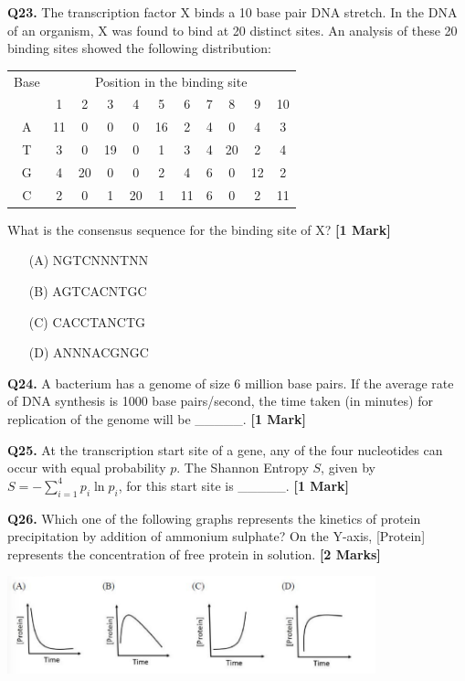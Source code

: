 \documentclass[11pt]{article}
\newcommand{\questiona}[2]{
    \noindent\textbf{Q#2.} #1 \hfill \textbf{[1 Mark]}
}
\newcommand{\questionb}[2]{
    \noindent\textbf{Q#2.} #1 \hfill \textbf{[2 Marks]}
}
\begin{document}
\vspace{0.5cm}

\questiona{The transcription factor X binds a 10 base pair DNA stretch. In the DNA of an organism, X was found to bind at 20 distinct sites. An analysis of these 20 binding sites showed the following distribution:

\begin{center}
\begin{tabular}{|c|c|c|c|c|c|c|c|c|c|c|}
\hline
Base & \multicolumn{10}{c|}{Position in the binding site} \\
\cline{2-11}
 & 1 & 2 & 3 & 4 & 5 & 6 & 7 & 8 & 9 & 10 \\
\hline
A & 11 & 0 & 0 & 0 & 16 & 2 & 4 & 0 & 4 & 3 \\
T & 3 & 0 & 19 & 0 & 1 & 3 & 4 & 20 & 2 & 4 \\
G & 4 & 20 & 0 & 0 & 2 & 4 & 6 & 0 & 12 & 2 \\
C & 2 & 0 & 1 & 20 & 1 & 11 & 6 & 0 & 2 & 11 \\
\hline
\end{tabular}
\end{center}

What is the consensus sequence for the binding site of X?}{23}
\begin{enumerate}
    \item[(A)] NGTCNNNTNN
    \item[(B)] AGTCACNTGC  
    \item[(C)] CACCTANCTG
    \item[(D)] ANNNACGNGC
\end{enumerate}

\vspace{0.5cm}

\questiona{A bacterium has a genome of size 6 million base pairs. If the average rate of DNA synthesis is 1000 base pairs/second, the time taken (in minutes) for replication of the genome will be \_\_\_\_\_.}{24}

\vspace{0.5cm}

\questiona{At the transcription start site of a gene, any of the four nucleotides can occur with equal probability $p$. The Shannon Entropy $S$, given by $S = -\sum_{i=1}^{4} p_i \ln p_i$, for this start site is \_\_\_\_\_.}{25}

\vspace{0.5cm}

\questionb{Which one of the following graphs represents the kinetics of protein precipitation by addition of ammonium sulphate? On the Y-axis, [Protein] represents the concentration of free protein in solution.}{26}
\begin{center}
    \includegraphics[width=0.8\textwidth]{figures/26.png}
\end{center}
\end{document}
